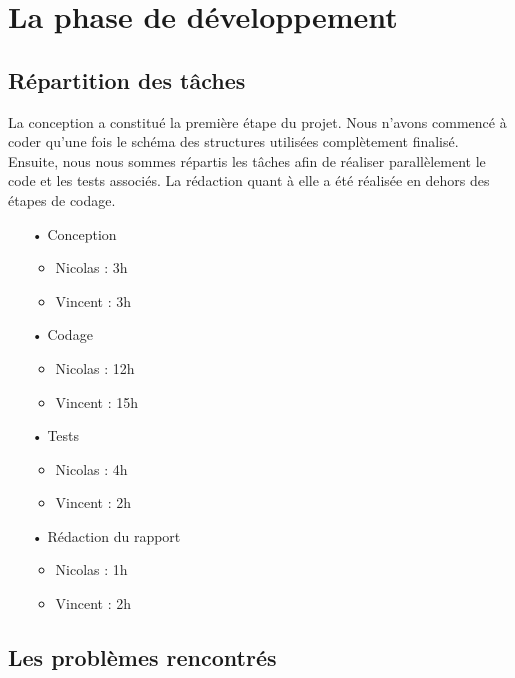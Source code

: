 \section{La phase de développement}

\subsection{Répartition des tâches}

La conception a constitué la première étape du projet. Nous n'avons commencé à coder qu'une fois le schéma des structures utilisées complètement finalisé. Ensuite, nous nous sommes répartis les tâches afin de réaliser parallèlement le code et les tests associés. 
La rédaction quant à elle a été réalisée en dehors des étapes de codage. 

\begin{itemize}
\item[•]{Conception}

	\begin{itemize}
		\item{Nicolas : 3h}
		\item{Vincent : 3h}
	\end{itemize}

\item[•]{Codage}

	\begin{itemize}
		\item{Nicolas : 12h}
		\item{Vincent : 15h}
	\end{itemize}

\item[•]{Tests}

	\begin{itemize}
		\item{Nicolas : 4h}
		\item{Vincent : 2h}
	\end{itemize}

\item[•]{Rédaction du rapport}
	\begin{itemize}
		\item{Nicolas : 1h}
		\item{Vincent : 2h}
	\end{itemize}
\end{itemize}

\subsection{Les problèmes rencontrés}

